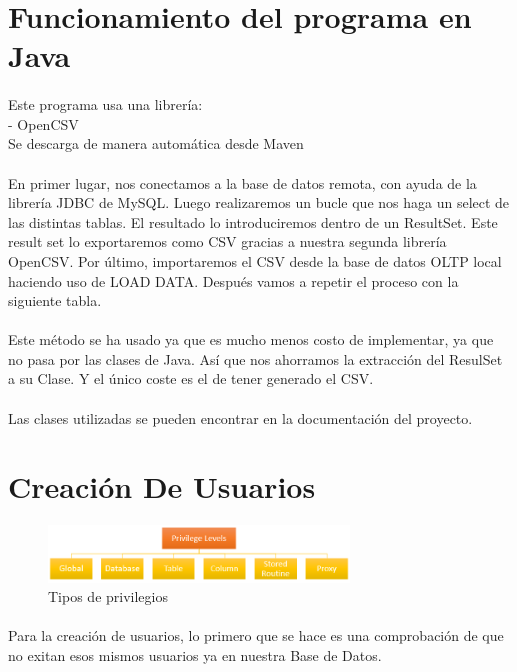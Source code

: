\documentclass[a4paper 
,twoside
]{article}
\begin{document}
\section{Funcionamiento del programa en Java}
  \paragraph{}
  Este programa usa una librería:\\
  -	OpenCSV\\
  Se descarga de manera automática desde Maven 
  \paragraph{}
  En primer lugar, nos conectamos a la base de datos remota, con ayuda de la librería JDBC de MySQL. Luego realizaremos un bucle que nos haga un select de las distintas tablas. El resultado lo introduciremos dentro de un ResultSet. Este result set lo exportaremos como CSV gracias a nuestra segunda librería OpenCSV. Por último, importaremos el CSV desde la base de datos OLTP local haciendo uso de LOAD DATA. Después vamos a repetir el proceso con la siguiente tabla.
  \paragraph{}
  Este método se ha usado ya que es mucho menos costo de implementar, ya que no pasa por las clases de Java. Así que nos ahorramos la extracción del ResulSet a su Clase. Y el único coste es el de tener generado el CSV.

  \paragraph{}
  Las clases utilizadas se pueden encontrar en la documentación del proyecto.
  \pagebreak
\section{Creación De Usuarios}
  \begin{figure}[H]
    \centering
    \includegraphics[width=8cm]{privilege.png}
    \caption{Tipos de privilegios}
  \end{figure}
  \paragraph{}
  Para la creación de usuarios, lo primero que se hace es una comprobación de que no exitan esos mismos usuarios ya en nuestra Base de Datos.
\end{document}
